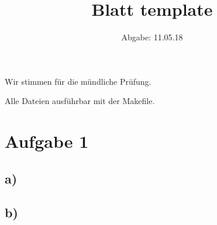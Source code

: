 

\usepackage{listings}
\usepackage[dvipsnames]{xcolor}

\title{Blatt template}
\date{
  Abgabe: 11.05.18
}


\maketitle
Wir stimmen für die mündliche Prüfung.

Alle Dateien ausführbar mit der Makefile. %
\section*{Aufgabe 1}
\subsection*{a)}

\subsection*{b)}






